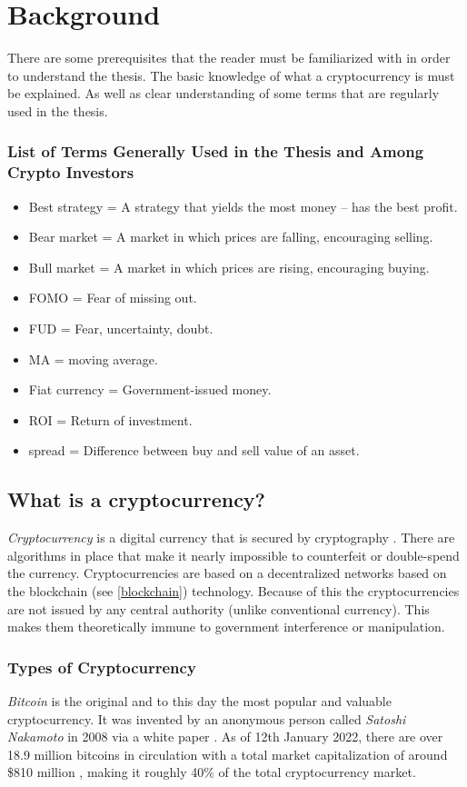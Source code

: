 \chapter{Background}
\label{chapter-background}

There are some prerequisites that the reader must be familiarized with in order to understand the thesis. The basic knowledge of what a cryptocurrency is must be explained. As well as clear understanding of some terms that are regularly used in the thesis.

\subsection*{List of Terms Generally Used in the Thesis and Among Crypto Investors}
\begin{itemize}
    \item Best strategy = A strategy that yields the most money -- has the best profit.
    \item Bear market = A market in which prices are falling, encouraging selling.
    \item Bull market = A market in which prices are rising, encouraging buying.
    \item FOMO = Fear of missing out.
    \item FUD = Fear, uncertainty, doubt.
    \item MA = moving average.
    \item Fiat currency = Government-issued money.
    \item ROI = Return of investment.
    \item spread = Difference between buy and sell value of an asset.
\end{itemize}

\section{What is a cryptocurrency?}
\emph{Cryptocurrency} is a digital currency that is secured by cryptography \cite{investopedia-cryptocurrency}. There are algorithms in place that make it nearly impossible to counterfeit or double-spend the currency. Cryptocurrencies are based on a decentralized networks based on the blockchain (see \ref{blockchain}) technology. Because of this the cryptocurrencies are not issued by any central authority (unlike conventional currency). This makes them theoretically immune to government interference or manipulation.

\subsection*{Types of Cryptocurrency}
\emph{Bitcoin} is the original and to this day the most popular and valuable cryptocurrency. It was invented by an anonymous person called \emph{Satoshi Nakamoto} in 2008 via a white paper \cite{satoshi}. As of 12th January 2022, there are over 18.9 million bitcoins in circulation with a total market capitalization of around \$810 million \cite{coinmarketcap}, making it roughly 40\% of the total cryptocurrency market.

